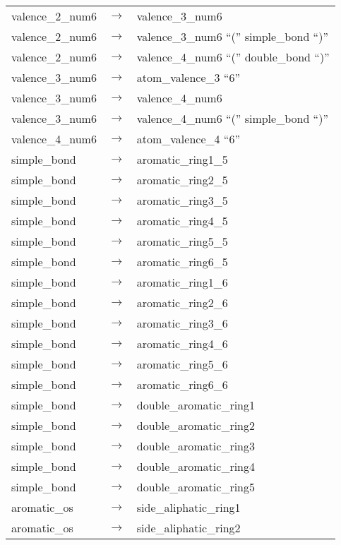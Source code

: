 \documentclass[../Document.tex]{subfiles}
\begin{document}
\begin{longtable}{m{} p{} p{}}
    valence\_2\_num6 & $\rightarrow$ & valence\_3\_num6 \\
    valence\_2\_num6 & $\rightarrow$ & valence\_3\_num6 ``('' simple\_bond ``)'' \\
    valence\_2\_num6 & $\rightarrow$ & valence\_4\_num6 ``('' double\_bond ``)'' \\
    valence\_3\_num6 & $\rightarrow$ & atom\_valence\_3 ``6'' \\
    valence\_3\_num6 & $\rightarrow$ & valence\_4\_num6 \\
    valence\_3\_num6 & $\rightarrow$ & valence\_4\_num6 ``('' simple\_bond ``)'' \\
    valence\_4\_num6 & $\rightarrow$ & atom\_valence\_4 ``6'' \\
    simple\_bond & $\rightarrow$ & aromatic\_ring1\_5 \\
    simple\_bond & $\rightarrow$ & aromatic\_ring2\_5 \\
    simple\_bond & $\rightarrow$ & aromatic\_ring3\_5 \\
    simple\_bond & $\rightarrow$ & aromatic\_ring4\_5 \\
    simple\_bond & $\rightarrow$ & aromatic\_ring5\_5 \\
    simple\_bond & $\rightarrow$ & aromatic\_ring6\_5 \\
    simple\_bond & $\rightarrow$ & aromatic\_ring1\_6 \\
    simple\_bond & $\rightarrow$ & aromatic\_ring2\_6 \\
    simple\_bond & $\rightarrow$ & aromatic\_ring3\_6 \\
    simple\_bond & $\rightarrow$ & aromatic\_ring4\_6 \\
    simple\_bond & $\rightarrow$ & aromatic\_ring5\_6 \\
    simple\_bond & $\rightarrow$ & aromatic\_ring6\_6 \\
    simple\_bond & $\rightarrow$ & double\_aromatic\_ring1 \\
    simple\_bond & $\rightarrow$ & double\_aromatic\_ring2 \\
    simple\_bond & $\rightarrow$ & double\_aromatic\_ring3 \\
    simple\_bond & $\rightarrow$ & double\_aromatic\_ring4 \\
    simple\_bond & $\rightarrow$ & double\_aromatic\_ring5 \\
    aromatic\_os & $\rightarrow$ & side\_aliphatic\_ring1 \\
    aromatic\_os & $\rightarrow$ & side\_aliphatic\_ring2 \\

\end{longtable}
\end{document}
